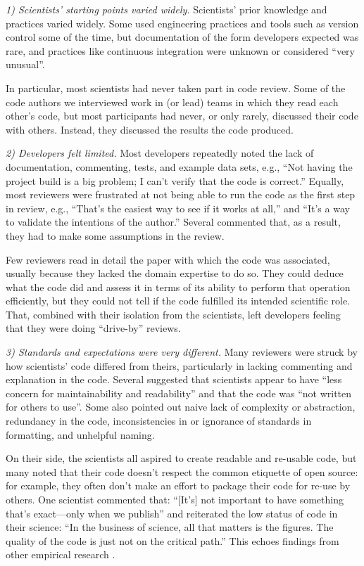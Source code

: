 \documentclass[10pt,twocolumn]{article}
\begin{document}
\noindent \emph{1) Scientists' starting points varied widely.}
Scientists' prior knowledge and practices varied widely.
Some used engineering practices and tools such as version control some of the time,
but documentation of the form developers expected was rare,
and practices like continuous integration were unknown or considered ``very unusual''.

In particular,
most scientists had never taken part in code review.
Some of the code authors we interviewed work in (or lead) teams in which they read each other's code,
but most participants had never, or only rarely, discussed their code with others.
Instead, they discussed the results the code produced.

\noindent \emph{2) Developers felt limited.}
Most developers repeatedly noted
the lack of documentation, commenting, tests, and example data sets,
e.g.,
``Not having the project build is a big problem; I can't verify that the code is correct.''
Equally,
most reviewers were frustrated at not being able to run the code as the first step in review,
e.g.,
``That's the easiest way to see if it works at all,''
and
``It's a way to validate the intentions of the author.''
Several commented that, as a result, they had to make some assumptions in the review.

Few reviewers read in detail the paper with which the code was associated,
usually because they lacked the domain expertise to do so.
They could deduce what the code did and assess it in terms of its ability to perform that operation efficiently,
but they could not tell if the code fulfilled its intended scientific role.
That,
combined with their isolation from the scientists,
left developers feeling that they were doing ``drive-by'' reviews.

\noindent \emph{3) Standards and expectations were very different.}
Many reviewers were struck by how scientists' code differed from theirs,
particularly in lacking commenting and explanation in the code.
Several suggested that scientists appear to have ``less concern for maintainability and readability''
and that the code was ``not written for others to use''.
Some also pointed out naive lack of complexity or abstraction,
redundancy in the code,
inconsistencies in or ignorance of standards in formatting,
and unhelpful naming.

On their side,
the scientists all aspired to create readable and re-usable code,
but many noted that their code doesn't respect the common etiquette of open source:
for example,
they often don't make an effort to package their code for re-use by others.
One scientist commented that:
``[It's] not important to have something that's exact---only when we publish''
and reiterated the low status of code in their science:
``In the business of science, all that matters is the figures. The quality of the code is just not on the critical path.''
This echoes findings from other empirical research \cite{b:segal2005,b:segal2007}.
\end{document}
